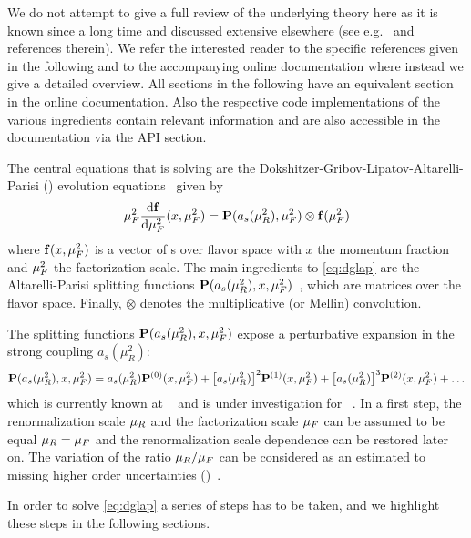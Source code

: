 We do not attempt to give a full review of the underlying theory
here as it is known since a long time and discussed extensive elsewhere
(see e.g.\ \cite{Peskin:1995ev,Ellis:1996mzs} and references therein).
We refer the interested reader to the specific references given in the following and to
the accompanying online documentation where instead we give a detailed
overview. All sections in the following have an equivalent section in
the online documentation. Also the respective code implementations of the
various ingredients contain relevant information and are also accessible
in the documentation via the API section.

The central equations that \eko{} is solving are the
Dokshitzer-Gribov-Lipatov-Altarelli-Parisi (\dglap) evolution
equations~\cite{Altarelli:1977zs,Gribov:1972ri,Dokshitzer:1977sg} given by
\begin{equation}
    \muF^2 \dv{\vb f}{\muF^2}{}(x,\muF^2) = \vb P (a_s(\muR^2),\muF^2) \otimes \vb f(\muF^2)
    \label{eq:dglap}
\end{equation}
where $\vb f(x,\mu_F^2)$ is a vector of \pdf{}s over flavor space with $x$ the
momentum fraction and $\mu_F^2$ the factorization scale.
The main ingredients to \cref{eq:dglap} are the Altarelli-Parisi splitting
functions $\vb P(a_s(\mu_R^2),x,\mu_F^2)$~\cite{Moch:2004pa,Vogt:2004mw}, which
are matrices over the flavor space.
Finally, $\otimes$ denotes the multiplicative (or Mellin) convolution.

The splitting functions $\vb P(a_s(\mu_R^2),x,\mu_F^2)$ expose a perturbative
expansion in the strong coupling $a_s(\mu_R^2)$:
\begin{equation}
    \vb P(a_s(\mu_R^2),x,\mu_F^2) = a_s(\mu_R^2) \vb P^{(0)}(x,\mu_F^2)
    + \qty[a_s(\mu_R^2)]^2 \vb P^{(1)}(x,\mu_F^2)
    + \qty[a_s(\mu_R^2)]^3 \vb P^{(2)}(x,\mu_F^2)
    + \ldots
\end{equation}
which is currently known at \nnlo{}~\cite{Moch:2004pa,Vogt:2004mw,Blumlein:2021enk} and is under
investigation for \nnnlo{}~\cite{Moch:2021qrk}.
In a first step, the renormalization scale $\mu_R$ and the factorization scale
$\mu_F$ can be assumed to be equal $\mu_R = \mu_F$ and the renormalization scale
dependence can be restored later on. The variation of the ratio $\mu_R/\mu_F$ can
be considered as an estimated to missing higher order
uncertainties (\mhou{})~\cite{AbdulKhalek:2019ihb}.

In order to solve \cref{eq:dglap} a series of steps has to be taken, and we
highlight these steps in the following sections.


